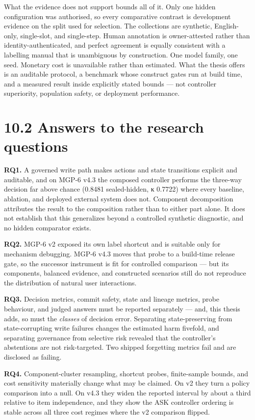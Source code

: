 What the evidence does not support bounds all of it. Only one hidden
configuration was authorised, so every comparative contrast is
development evidence on the split used for selection. The collections
are synthetic, English-only, single-slot, and single-step. Human
annotation is owner-attested rather than identity-authenticated, and
perfect agreement is equally consistent with a labelling manual that is
unambiguous by construction. One model family, one seed. Monetary cost
is unavailable rather than estimated. What the thesis offers is an
auditable protocol, a benchmark whose construct gates run at build time,
and a measured result inside explicitly stated bounds --- not controller
superiority, population safety, or deployment performance.

\section{10.2 Answers to the research
questions}\label{answers-to-the-research-questions}

\textbf{RQ1.} A governed write path makes actions and state transitions
explicit and auditable, and on MGP-6 v4.3 the composed controller
performs the three-way decision far above chance (0.8481 sealed-hidden,
κ 0.7722) where every baseline, ablation, and deployed external system
does not. Component decomposition attributes the result to the
composition rather than to either part alone. It does not establish that
this generalizes beyond a controlled synthetic diagnostic, and no hidden
comparator exists.

\textbf{RQ2.} MGP-6 v2 exposed its own label shortcut and is suitable
only for mechanism debugging. MGP-6 v4.3 moves that probe to a
build-time release gate, so the successor instrument is fit for
controlled comparison --- but its components, balanced evidence, and
constructed scenarios still do not reproduce the distribution of natural
user interactions.

\textbf{RQ3.} Decision metrics, commit safety, state and lineage
metrics, probe behaviour, and judged answers must be reported separately
--- and, this thesis adds, so must the \emph{classes} of decision error.
Separating state-preserving from state-corrupting write failures changes
the estimated harm fivefold, and separating governance from selective
risk revealed that the controller's abstentions are not risk-targeted.
Two shipped forgetting metrics fail and are disclosed as failing.

\textbf{RQ4.} Component-cluster resampling, shortcut probes,
finite-sample bounds, and cost sensitivity materially change what may be
claimed. On v2 they turn a policy comparison into a null. On v4.3 they
widen the reported interval by about a third relative to item
independence, and they show the ASK controller ordering is stable across
all three cost regimes where the v2 comparison flipped.

